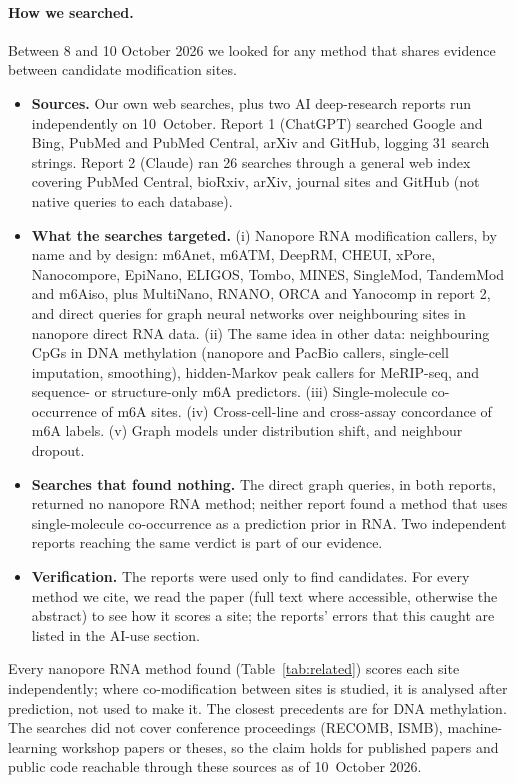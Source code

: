 \documentclass[11pt,a4paper]{article}
\begin{document}
\paragraph{How we searched.} Between 8 and 10 October 2026 we looked for any
method that shares evidence between candidate modification sites.
\begin{itemize}
    \item \textbf{Sources.} Our own web searches, plus two AI deep-research
    reports run independently on 10~October. Report 1 (ChatGPT) searched
    Google and Bing, PubMed and PubMed Central, arXiv and GitHub, logging 31
    search strings. Report 2 (Claude) ran 26 searches through a general web
    index covering PubMed Central, bioRxiv, arXiv, journal sites and GitHub
    (not native queries to each database).
    \item \textbf{What the searches targeted.} (i) Nanopore RNA modification
    callers, by name and by design: m6Anet, m6ATM, DeepRM, CHEUI, xPore,
    Nanocompore, EpiNano, ELIGOS, Tombo, MINES, SingleMod, TandemMod and
    m6Aiso, plus MultiNano, RNANO, ORCA and Yanocomp in report 2, and
    direct queries for graph neural networks over neighbouring sites in
    nanopore direct RNA data. (ii) The same idea in other data: neighbouring
    CpGs in DNA methylation (nanopore and PacBio callers, single-cell
    imputation, smoothing), hidden-Markov peak callers for MeRIP-seq, and
    sequence- or structure-only m6A predictors. (iii) Single-molecule
    co-occurrence of m6A sites. (iv) Cross-cell-line and cross-assay
    concordance of m6A labels. (v) Graph models under distribution shift,
    and neighbour dropout.
    \item \textbf{Searches that found nothing.} The direct graph queries, in
    both reports, returned no nanopore RNA method; neither report found a
    method that uses single-molecule co-occurrence as a prediction prior in
    RNA. Two independent reports reaching the same verdict is part of our
    evidence.
    \item \textbf{Verification.} The reports were used only to find
    candidates. For every method we cite, we read the paper (full text where
    accessible, otherwise the abstract) to see how it scores a site; the
    reports' errors that this caught are listed in the AI-use section.
\end{itemize}
Every nanopore RNA method found (Table~\ref{tab:related}) scores each site
independently; where co-modification between sites is studied, it is
analysed after prediction, not used to make it. The closest precedents are
for DNA methylation. The searches did not cover conference proceedings
(RECOMB, ISMB), machine-learning workshop papers or theses, so the claim
holds for published papers and public code reachable through these sources
as of 10~October 2026.
\end{document}

